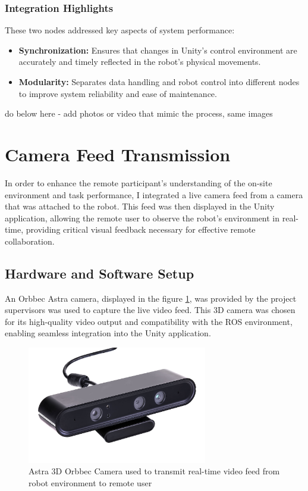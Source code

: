     \subsubsection{Integration Highlights}
    These two nodes addressed key aspects of system performance:
    \begin{itemize}
        \item \textbf{Synchronization:} Ensures that changes in Unity’s control environment are accurately and timely reflected in the robot's physical movements.
        \item \textbf{Modularity:} Separates data handling and robot control into different nodes to improve system reliability and ease of maintenance.
    \end{itemize}




    
    do below here - add photos or video that mimic the process, same images
    
    \section{Camera Feed Transmission}

    In order to enhance the remote participant's understanding of the on-site environment and task performance, I integrated a live camera feed from a camera that was attached to the robot. This feed was then displayed in the Unity application, allowing the remote user to observe the robot's environment in real-time, providing critical visual feedback necessary for effective remote collaboration.

    \subsection{Hardware and Software Setup}
    An Orbbec Astra camera, displayed in the figure \ref{fig:astra-camera}, was provided by the project supervisors was used to capture the live video feed. This 3D camera was chosen for its high-quality video output and compatibility with the ROS environment, enabling seamless integration into the Unity application.
    
    \begin{figure}[h]
        \centering
        \includegraphics[width=0.7\textwidth]{figs/AstraSeries_3.jpg}
        \caption{Astra 3D Orbbec Camera used to transmit real-time video feed from robot environment to remote user}
        \label{fig:astra-camera}
    \end{figure}
    \FloatBarrier

